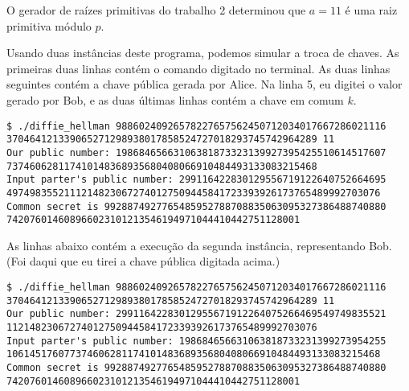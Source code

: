 \documentclass{article}
\begin{document}
O gerador de raízes primitivas do trabalho 2 determinou que
$a = 11$ é uma raiz primitiva módulo $p$.

Usando duas instâncias deste programa,
podemos simular a troca de chaves.
As primeiras duas linhas contém o comando digitado no terminal.
As duas linhas seguintes contém a chave pública gerada por Alice.
Na linha 5,
eu digitei o valor gerado por Bob,
e as duas últimas linhas contém a chave em comum $k$.

\begin{verbatim}
$ ./diffie_hellman 98860240926578227657562450712034017667286021116
370464121339065271298938017858524727018293745742964289 11
Our public number: 19868465663106381873323139927395425510614517607
737460628117410148368935680408066910484493133083215468
Input parter's public number: 299116422830129556719122640752664695
49749835521112148230672740127509445841723393926173765489992703076
Common secret is 9928874927765485952788708835063095327386488740880
742076014608966023101213546194971044410442751128001
\end{verbatim}

As linhas abaixo contém a execução da segunda instância,
representando Bob.
(Foi daqui que eu tirei a chave pública digitada acima.)

\begin{verbatim}
$ ./diffie_hellman 98860240926578227657562450712034017667286021116
370464121339065271298938017858524727018293745742964289 11
Our public number: 29911642283012955671912264075266469549749835521
112148230672740127509445841723393926173765489992703076
Input parter's public number: 198684656631063818733231399273954255
10614517607737460628117410148368935680408066910484493133083215468
Common secret is 9928874927765485952788708835063095327386488740880
742076014608966023101213546194971044410442751128001
\end{verbatim}
\end{document}
